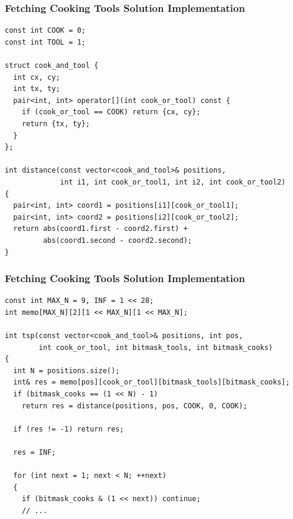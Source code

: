 \documentclass{beamer}
\begin{document}

\begin{frame}[containsverbatim]
\frametitle{Fetching Cooking Tools Solution Implementation}

\scriptsize
\begin{lstlisting}
const int COOK = 0;
const int TOOL = 1;

struct cook_and_tool {
  int cx, cy;
  int tx, ty;
  pair<int, int> operator[](int cook_or_tool) const {
    if (cook_or_tool == COOK) return {cx, cy};
    return {tx, ty};
  }
};

int distance(const vector<cook_and_tool>& positions,
             int i1, int cook_or_tool1, int i2, int cook_or_tool2)
{
  pair<int, int> coord1 = positions[i1][cook_or_tool1];
  pair<int, int> coord2 = positions[i2][cook_or_tool2];
  return abs(coord1.first - coord2.first) +
         abs(coord1.second - coord2.second);
}
\end{lstlisting}

\end{frame}

\begin{frame}[containsverbatim]
\frametitle{Fetching Cooking Tools Solution Implementation}

\scriptsize
\begin{lstlisting}
const int MAX_N = 9, INF = 1 << 28;
int memo[MAX_N][2][1 << MAX_N][1 << MAX_N];

int tsp(const vector<cook_and_tool>& positions, int pos,
        int cook_or_tool, int bitmask_tools, int bitmask_cooks)
{
  int N = positions.size();
  int& res = memo[pos][cook_or_tool][bitmask_tools][bitmask_cooks];
  if (bitmask_cooks == (1 << N) - 1)
    return res = distance(positions, pos, COOK, 0, COOK);

  if (res != -1) return res;

  res = INF;

  for (int next = 1; next < N; ++next)
  {
    if (bitmask_cooks & (1 << next)) continue;
    // ...
\end{lstlisting}

\end{frame}
\end{document}
